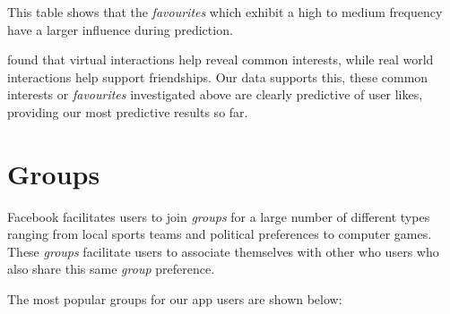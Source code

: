 This table shows that the \emph{favourites} which exhibit a high to medium frequency have a larger influence during prediction. 

\cite{brandtzag2011facebook} found that virtual interactions help reveal common interests, while real world interactions help 
support friendships. Our data supports this, these common interests or \emph{favourites} investigated above are clearly predictive 
of user likes, providing our most predictive results so far.


\section{Groups}
\label{sec:groups}

Facebook facilitates users to join \emph{groups} for a large number of different types ranging from 
local sports teams and political preferences to computer games. These \emph{groups} facilitate users to associate
themselves with other who users who also share this same \emph{group} preference.

The most popular groups for our app users are shown below:


